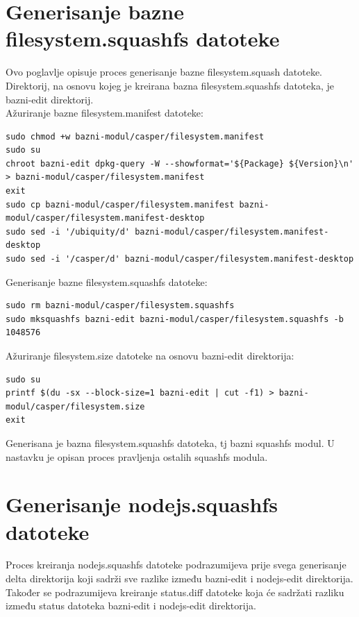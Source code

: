 \documentclass[12pt,vi]{mitthesis}
\begin{document}
\section*{Generisanje bazne filesystem.squashfs datoteke}
\indent
Ovo poglavlje opisuje proces generisanje bazne filesystem.squash datoteke. Direktorij, na osnovu kojeg je kreirana bazna filesystem.squashfs datoteka, je bazni-edit direktorij.\\
\noindent
Ažuriranje bazne filesystem.manifest datoteke:
\begin{lstlisting}[style=BashInputStyle]
sudo chmod +w bazni-modul/casper/filesystem.manifest
sudo su
chroot bazni-edit dpkg-query -W --showformat='${Package} ${Version}\n' > bazni-modul/casper/filesystem.manifest
exit
sudo cp bazni-modul/casper/filesystem.manifest bazni-modul/casper/filesystem.manifest-desktop
sudo sed -i '/ubiquity/d' bazni-modul/casper/filesystem.manifest-desktop
sudo sed -i '/casper/d' bazni-modul/casper/filesystem.manifest-desktop
\end{lstlisting}
\noindent
Generisanje bazne filesystem.squashfs datoteke:
\begin{lstlisting}[style=BashInputStyle]
sudo rm bazni-modul/casper/filesystem.squashfs
sudo mksquashfs bazni-edit bazni-modul/casper/filesystem.squashfs -b 1048576
\end{lstlisting}
\noindent
Ažuriranje filesystem.size datoteke na osnovu bazni-edit direktorija:
\begin{lstlisting}[style=BashInputStyle]
sudo su
printf $(du -sx --block-size=1 bazni-edit | cut -f1) > bazni-modul/casper/filesystem.size
exit
\end{lstlisting}
\noindent
Generisana je bazna filesystem.squashfs datoteka, tj bazni squashfs modul. U nastavku je opisan proces pravljenja ostalih squashfs modula.
\section*{Generisanje nodejs.squashfs datoteke}
\indent
Proces kreiranja nodejs.squashfs datoteke podrazumijeva prije svega generisanje delta direktorija koji sadrži sve razlike između bazni-edit i nodejs-edit direktorija. Također se podrazumijeva kreiranje status.diff datoteke koja će sadržati razliku između status datoteka bazni-edit i nodejs-edit direktorija.
\end{document}
